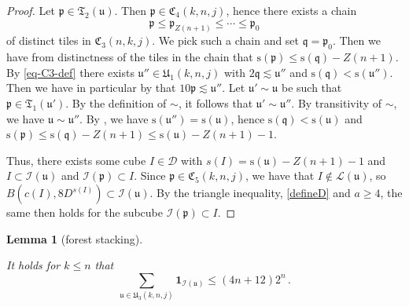 \documentclass[10pt,a4paper]{article}
\theoremstyle{plain}
\newtheorem{lemma}[theorem]{Lemma}
\theoremstyle{definition}
\numberwithin{equation}{subsection}
\newcommand{\fp}{{\mathfrak p}}
\newcommand{\fu}{{\mathfrak u}}
\newcommand{\fU}{{\mathfrak U}}
\newcommand{\fq}{{\mathfrak q}}
\newcommand{\fC}{{\mathfrak C}}
\newcommand{\ps}{{\mathrm{s}}}
\newcommand{\scI}{{\mathcal{I}}} %
\newcommand{\lean}[1]{}
\newcommand{\leanok}{}
\begin{document}
\begin{proof}
    \leanok
    Let $\fp \in \mathfrak{T}_2(\fu)$. Then $\fp \in \fC_4(k,n,j)$, hence there exists a chain
    $$
        \fp \le \fp_{Z(n+1)} \le \dotsb \le \fp_0
    $$
    of distinct tiles in $\fC_3(n,k,j)$. We pick such a chain and set $\fq = \fp_0$.
    Then we have from distinctness of the tiles in the chain that
    $\ps(\fp) \le \ps(\fq) - Z(n+1)$.
    By \eqref{eq-C3-def} there exists $\fu'' \in \fU_1(k,n,j)$ with $2\fq \lesssim \fu''$ and $\ps(\fq) < \ps(\fu'')$.
    Then we have in particular by  that $10 \fp \lesssim \fu''$.
    Let $\fu' \sim \fu$ be such that $\fp \in \mathfrak{T}_1(\fu')$.
    By the definition of $\sim$, it follows that $\fu' \sim \fu''$.
    By transitivity of $\sim$, we have $\fu \sim \fu''$.
    By , we have $\ps(\fu'') = \ps(\fu)$, hence $\ps(\fq) < \ps(\fu)$ and $\ps(\fp) \le \ps(\fq) - Z(n+1) \le \ps(\fu) - Z(n+1) - 1$.

    Thus, there exists some cube $I \in \mathcal{D}$ with $s(I) = \ps(\fu) - Z(n+1) - 1$ and $I \subset \scI(\fu)$ and $\scI(\fp) \subset I$.
    Since $\fp \in \fC_5(k,n,j)$, we have that $I \notin \mathcal{L}(\fu)$, so $B(c(I), 8D^{s(I)}) \subset \scI(\fu)$.
    By the triangle inequality, \eqref{defineD} and $a \ge 4$, the same then holds for the subcube $\scI(\fp) \subset I$.
\end{proof}


\begin{lemma}[forest stacking]
    \label{forest-stacking}
    \leanok
    \lean{forest_stacking}
    It holds for $k\le n$ that
    \begin{equation}
        \sum_{\fu \in \fU_3(k,n,j)} \mathbf{1}_{\scI(\fu)} \le (4n+12)2^{n}\,.
    \end{equation}
\end{lemma}
\end{document}
